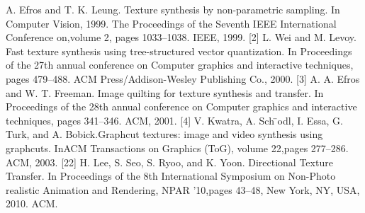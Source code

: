 \begin{References}
	[1] A. Efros and T. K. Leung.  Texture synthesis by non-parametric sampling. In Computer Vision, 1999. The Proceedings of the Seventh IEEE International Conference on,volume 2, pages 1033–1038. IEEE, 1999.
	[2] L. Wei and M. Levoy.  Fast texture synthesis using tree-structured vector quantization. In Proceedings of the 27th annual conference on Computer graphics and interactive techniques, pages 479–488. ACM Press/Addison-Wesley Publishing Co., 2000.
	[3] A. A. Efros and W. T. Freeman.  Image quilting for texture synthesis and transfer. In Proceedings of the 28th annual conference on Computer graphics and interactive techniques, pages 341–346. ACM, 2001.
	[4] V. Kwatra, A. Sch ̈odl, I. Essa, G. Turk, and A. Bobick.Graphcut textures: image and video synthesis using graphcuts. InACM Transactions on Graphics (ToG), volume 22,pages 277–286. ACM, 2003.
	[22] H. Lee, S. Seo, S. Ryoo, and K. Yoon. Directional Texture Transfer. In Proceedings of the 8th International Symposium on Non-Photo realistic Animation and Rendering, NPAR ’10,pages 43–48, New York, NY, USA, 2010. ACM.
\end{References}